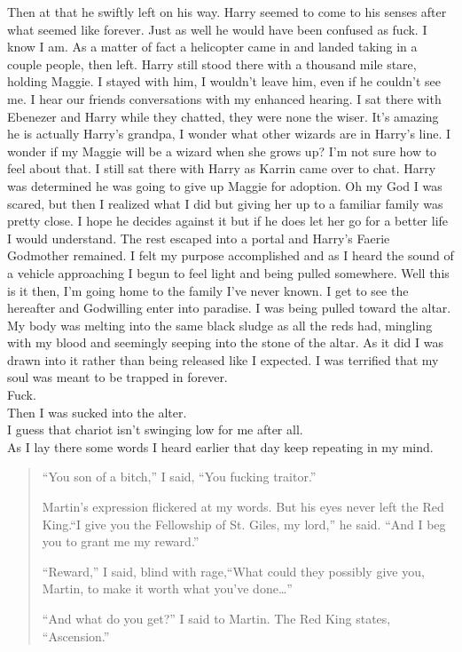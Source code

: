 Then at that he swiftly left on his way. Harry seemed to come to his senses after what seemed like forever. Just as well he would have been confused as fuck. I know I am.  As a matter of fact a helicopter came in and landed taking in a couple people, then left. Harry still stood there with a thousand mile stare, holding Maggie. I stayed with him, I wouldn't leave him, even if he couldn't see me. I hear our friends conversations with my enhanced hearing. I sat there with Ebenezer and Harry while they chatted, they were none the wiser. It's amazing he is actually Harry's grandpa, I wonder what other wizards are in Harry's line. I wonder if my Maggie will be a wizard when she grows up? I'm not sure how to feel about that. I still sat there with Harry as Karrin came over to chat. Harry was determined he was going to give up Maggie for adoption. Oh my God I was scared, but then I realized what I did but giving her up to a familiar family was pretty close. I hope he decides against it but if he does let her go for a better life I would understand. The rest escaped into a portal and Harry's Faerie Godmother remained. I felt my purpose accomplished and as I heard the sound of a vehicle approaching I begun to feel light and being pulled somewhere. Well this is it then, I'm going home to the family I've never known. I get to see the hereafter and Godwilling enter into paradise. I was being pulled toward the altar. My body was melting into the same black sludge as all the reds had, mingling with my blood and seemingly seeping into the stone of the altar. As it did I was drawn into it rather than being released like I expected. I was terrified that my soul was meant to be trapped in \chichenitza forever.\\

Fuck.\\

Then I was sucked into the alter.\\

I guess that chariot isn't swinging low for me after all.\\

As I lay there some words I heard earlier that day keep repeating in my mind.
\begin{quotation}
	``You son of a bitch,'' I said, ``You fucking traitor.''
	
	Martin’s expression flickered at my words. But his eyes never left the Red King.``I give you the Fellowship of St. Giles, my lord,'' he said. ``And I beg you to grant me my reward.''
	
	``Reward,'' I said, blind with rage,``What could they possibly give you, Martin, to make it worth what you’ve done\dots''

	``And what do you get?'' I said to Martin.
	The Red King states, ``Ascension.''
\end{quotation}

